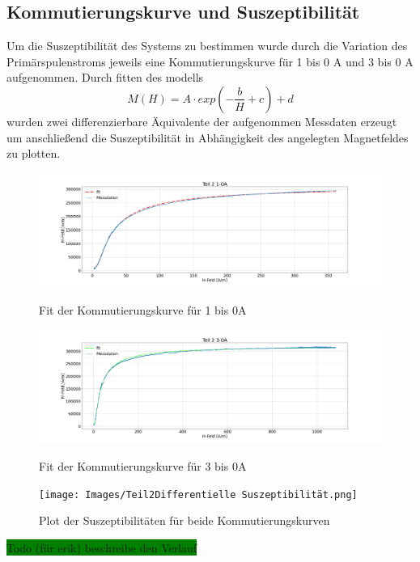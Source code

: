     \subsection{Kommutierungskurve und Suszeptibilität}
        Um die Suszeptibilität des Systems zu bestimmen wurde durch die Variation des Primärspulenstroms jeweils eine Kommutierungskurve für 1 bis 0 A und 3 bis 0 A aufgenommen.
        Durch fitten des modells 
        \begin{equation}
            M(H) = A \cdot exp(-\frac{b}{H} + c) + d
        \end{equation}
        wurden zwei differenzierbare Äquivalente der aufgenommen Messdaten erzeugt um anschließend die Suszeptibilität in Abhängigkeit des angelegten Magnetfeldes zu plotten.
        \begin{figure}
            \centering
            \includegraphics[width=\textwidth]{Images/Teil2Teil 2 1-0A.png}
            \label{Teil2-1A}
            \caption{Fit der Kommutierungskurve für 1 bis 0A}
        \end{figure}
        \begin{figure}
            \centering
            \includegraphics[width=\textwidth]{Images/Teil2Teil 2 3-0A.png}
            \label{Teil2-3A}
            \caption{Fit der Kommutierungskurve für 3 bis 0A}
        \end{figure}
        \begin{figure}
            \centering
            \texttt{[image: Images/Teil2Differentielle Suszeptibilität.png]}
            \label{DiffSus}
            \caption{Plot der Suszeptibilitäten für beide Kommutierungskurven}
        \end{figure}
        \colorbox{green}{Todo (für erik) beschreibe den Verlauf}